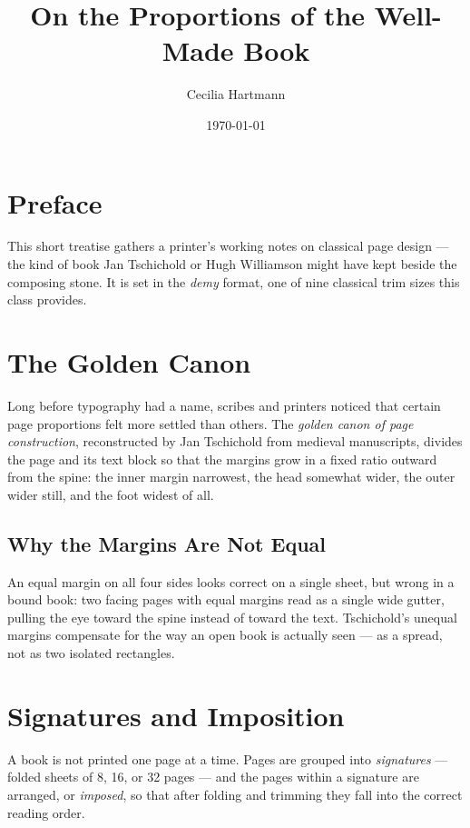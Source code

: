 \documentclass[demy,11pt,openright,titlepage]{octavo}
\title{On the Proportions of the Well-Made Book}
\author{Cecilia Hartmann}
\date{\today}
\begin{document}
\frontmatter

\maketitle

\chapter*{Preface}
This short treatise gathers a printer's working notes on classical
page design — the kind of book Jan Tschichold or Hugh Williamson might
have kept beside the composing stone. It is set in the \emph{demy}
format, one of nine classical trim sizes this class provides.

\tableofcontents

\mainmatter

\chapter{The Golden Canon}

Long before typography had a name, scribes and printers noticed that
certain page proportions felt more settled than others. The
\emph{golden canon of page construction}, reconstructed by Jan
Tschichold from medieval manuscripts, divides the page and its text
block so that the margins grow in a fixed ratio outward from the
spine: the inner margin narrowest, the head somewhat wider, the outer
wider still, and the foot widest of all.

\section{Why the Margins Are Not Equal}

An equal margin on all four sides looks correct on a single sheet, but
wrong in a bound book: two facing pages with equal margins read as a
single wide gutter, pulling the eye toward the spine instead of toward
the text. Tschichold's unequal margins compensate for the way an open
book is actually seen — as a spread, not as two isolated rectangles.

\chapter{Signatures and Imposition}

A book is not printed one page at a time. Pages are grouped into
\emph{signatures} — folded sheets of 8, 16, or 32 pages — and the
pages within a signature are arranged, or \emph{imposed}, so that
after folding and trimming they fall into the correct reading order.
\end{document}

